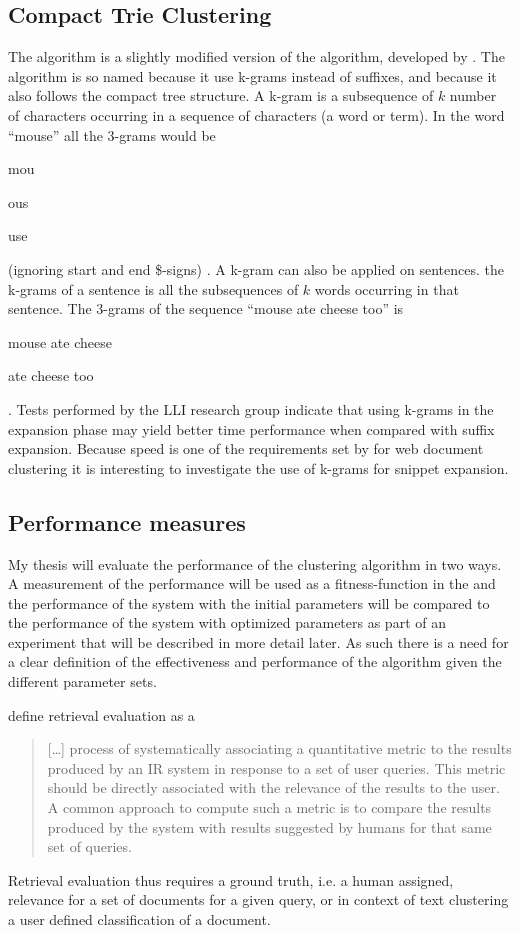 \subsection{Compact Trie Clustering}
The \CTC algorithm is a slightly modified version of the \STC algorithm, developed by \supervisor. The algorithm is so named because it use k-grams instead of suffixes, and because it also follows the compact tree structure. A k-gram is a subsequence of \(k\) number of characters occurring in a sequence of characters (a word or term). In the word ``mouse'' all the 3-grams would be 
\begin{inparaenum}[(1)] 
    \item mou
    \item ous
    \item use
\end{inparaenum}
(ignoring start and end \$-signs)
\cite{Manning2009}. A k-gram can also be applied on sentences. the k-grams of a sentence is all the subsequences of \(k\) words occurring in that sentence. The 3-grams of the sequence ``mouse ate cheese too'' is
\begin{inparaenum}[(1)] 
    \item mouse ate cheese
    \item ate cheese too
\end{inparaenum}.
Tests performed by the LLI research group indicate that using k-grams in the expansion phase may yield better time performance when compared with suffix expansion. Because speed is one of the requirements set by \cite{Oren1998} for web document clustering it is interesting to investigate the use of k-grams for snippet expansion.

\subsection{Performance measures}
My thesis will evaluate the performance of the clustering algorithm in two ways. A measurement of the performance will be used as a fitness-function in the \GA and the performance of the system with the initial parameters will be compared to the performance of the system with optimized parameters as part of an experiment that will be described in more detail later. As such there is a need for a clear definition of the effectiveness and performance of the \CTC algorithm given the different parameter sets.

\cite[131]{Baeza-Yates2011b} define retrieval evaluation as a \begin{quote} 
[\dots] process of systematically associating a quantitative metric to the results produced by an IR system in response to a set of user queries. This metric should be directly associated with the relevance of the results to the user. A common approach to compute such a metric is to compare the results produced by the system with results suggested by humans for that same set of queries.
\end{quote}
Retrieval evaluation thus requires a ground truth, i.e. a human assigned, relevance for a set of documents for a given query, or in context of text clustering a user defined classification of a document.


